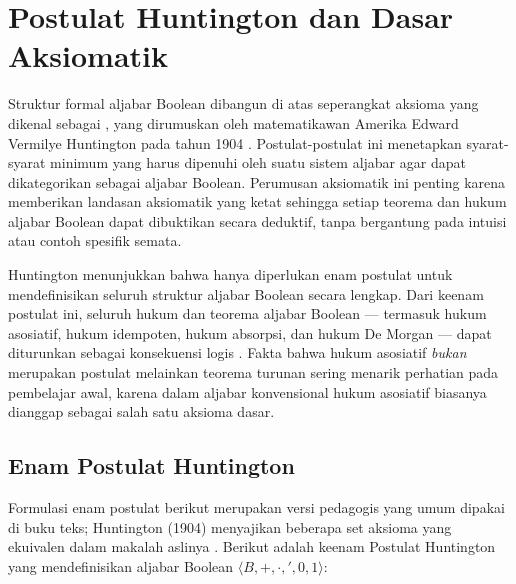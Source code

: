 \section{Postulat Huntington dan Dasar Aksiomatik}

Struktur formal aljabar Boolean dibangun di atas seperangkat aksioma yang dikenal sebagai , yang dirumuskan oleh matematikawan Amerika Edward Vermilye Huntington pada tahun 1904 \cite{huntington1904}. Postulat-postulat ini menetapkan syarat-syarat minimum yang harus dipenuhi oleh suatu sistem aljabar agar dapat dikategorikan sebagai aljabar Boolean. Perumusan aksiomatik ini penting karena memberikan landasan aksiomatik yang ketat sehingga setiap teorema dan hukum aljabar Boolean dapat dibuktikan secara deduktif, tanpa bergantung pada intuisi atau contoh spesifik semata.

Huntington menunjukkan bahwa hanya diperlukan enam postulat untuk mendefinisikan seluruh struktur aljabar Boolean secara lengkap. Dari keenam postulat ini, seluruh hukum dan teorema aljabar Boolean --- termasuk hukum asosiatif, hukum idempoten, hukum absorpsi, dan hukum De Morgan --- dapat diturunkan sebagai konsekuensi logis \cite{rosen2019}. Fakta bahwa hukum asosiatif \emph{bukan} merupakan postulat melainkan teorema turunan sering menarik perhatian pada pembelajar awal, karena dalam aljabar konvensional hukum asosiatif biasanya dianggap sebagai salah satu aksioma dasar.

\subsection{Enam Postulat Huntington}

Formulasi enam postulat berikut merupakan versi pedagogis yang umum dipakai di buku teks; Huntington (1904) menyajikan beberapa set aksioma yang ekuivalen dalam makalah aslinya \cite{huntington1904}. Berikut adalah keenam Postulat Huntington yang mendefinisikan aljabar Boolean $\langle B, +, \cdot, ', 0, 1 \rangle$:

